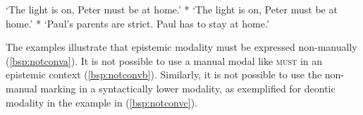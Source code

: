 \begin{exe}
\ex\label{bsp:notconv}\begin{xlist}
\ex {}  
\glt `The light is on, Peter must be at home.'\label{bsp:notconva}
\ex {} * 
%
\glt `The light is on, Peter must be at home.'\label{bsp:notconvb}
\ex {} * 
%
%
\glt `Paul's parents are strict. Paul has to stay at home.'\label{bsp:notconvc}
\end{xlist}
\end{exe}

\noindent The examples illustrate that epistemic modality must be expressed non-manually (\ref{bsp:notconva}). It is not possible to use a manual modal like \textsc{must} in an epistemic context (\ref{bsp:notconvb}). Similarly, it is not possible to use the non-manual marking in a syntactically lower modality, as exemplified for deontic modality in the example in (\ref{bsp:notconvc}).

